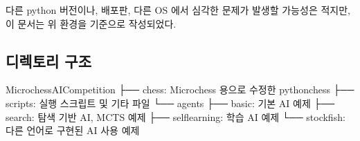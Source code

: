 \documentclass[letterpaper,10pt,english]{sphinxmanual}
\begin{document}
다른 python 버전이나, 배포판, 다른 OS 에서 심각한 문제가 발생할 가능성은 적지만,
이 문서는 위 환경을 기준으로 작성되었다.


\subsection{디렉토리 구조}
\label{\detokenize{02-microchess_ai_platform:id3}}
%
\begin{sphinxVerbatim}[commandchars=\\\{\}]
MicrochessAICompetition
 ├── chess: Microchess 용으로 수정한 python\PYGZhy{}chess
 ├── scripts: 실행 스크립트 및 기타 파일
 └── agents
         ├── basic: 기본 AI 예제
         ├── search: 탐색 기반 AI, MCTS 예제
         ├── self\PYGZus{}learning: 학습 AI 예제
         └── stockfish: 다른 언어로 구현된 AI 사용 예제
\end{sphinxVerbatim}
\end{document}
